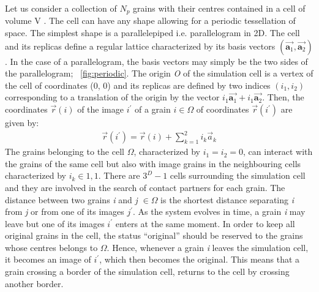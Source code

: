 Let us consider a collection of $N_{p}$ grains with their centres contained 
in a cell of volume 
V . The cell can have any shape allowing for a periodic tessellation of space. 
The simplest shape 
is a parallelepiped i.e. parallelogram in 2D. The cell and its replicas define 
a regular lattice 
characterized by its basis vectors 
$(\overrightarrow{\mathbf{a}_{1}},\overrightarrow{\mathbf{a}_{2}})$. In the 
case of a 
parallelogram, the basis vectors may simply be the two sides of the 
parallelogram; 
~\cref{fig:periodic}. The origin \textit{O} of the simulation cell is a vertex 
of the cell of 
coordinates (0, 0) and its replicas are defined by two indices $(i_{1}, i_{2})$ 
corresponding to a 
translation of the origin by the vector 
$i_{1}\overrightarrow{\mathbf{a}_{1}}+i_{1}\overrightarrow{\mathbf{a}_{2}}$. 
Then, the coordinates 
$\overrightarrow{r}(\mathit{i})$ of the image $\mathit{i}^{\prime}$ of a 
grain $\mathit{i} \in 
\Omega$ of coordinates  $\overrightarrow{r}(\mathit{i}^{\prime})$ are given by:
\begin{align}
\overrightarrow{r}(i^{\prime})=\overrightarrow{r}(i)+\sum\limits_{k=1}^{2}{\mathit{i}_{\mathit{k}}\overrightarrow{\mathbf{\mathit{a}}}_{\mathit{k}}}
\end{align}
The grains belonging to the cell $\Omega$, characterized by $\mathit{i}_{1} 
= \mathit{i}_{2} = 
0$, can interact with the grains of the same cell but also with image 
grains in the 
neighbouring cells characterized by $\mathit{i}_{k}\in {1, 1}$. There are  
$3^{D} - 1$ cells 
surrounding the simulation cell and they are involved in the search of contact 
partners for each 
grain. The distance between two grains \textit{i} and \textit{j} $\in 
\Omega$ is the 
shortest 
distance separating \textit{i} from \textit{j} or from one of its images 
$\mathit{j}^{\prime}$. As 
the system evolves in time, a grain \textit{i} may leave but one of its 
images 
$\mathit{i}^{\prime}$ enters at the same moment. In order to keep all original 
grains in the 
cell, the status ``original'' should be reserved to the grains whose centres 
belongs to 
$\Omega$. Hence, whenever a grain \textit{i} leaves the simulation cell, it 
becomes an image of 
$\mathit{i}^{\prime}$, which then becomes the original. This means that a 
grain crossing a 
border of the simulation cell, returns to the cell by crossing another border.
